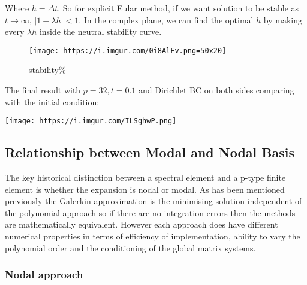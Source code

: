 \documentclass[
]{scrartcl}
\begin{document}
Where \(h=\Delta t\). So for explicit Eular method, if we want solution
to be stable as \(t\to\infty\), \(|1+\lambda h|<1\). In the complex
plane, we can find the optimal \(h\) by making every \(\lambda h\)
inside the neutral stability curve.

\begin{figure}
\centering
\texttt{[image: https://i.imgur.com/0i8AlFv.png=50x20]}
\caption{stability\%}
\end{figure}

The final result with \(p=32, t=0.1\) and Dirichlet BC on both sides
comparing with the initial condition:

\texttt{[image: https://i.imgur.com/ILSghwP.png]}

\hypertarget{relationship-between-modal-and-nodal-basis}{%
\subsection{Relationship between Modal and Nodal
Basis}\label{relationship-between-modal-and-nodal-basis}}

The key historical distinction between a spectral element and a p-type
finite element is whether the expansion is nodal or modal. As has been
mentioned previously the Galerkin approximation is the minimising
solution independent of the polynomial approach so if there are no
integration errors then the methods are mathematically equivalent.
However each approach does have different numerical properties in terms
of efficiency of implementation, ability to vary the polynomial order
and the conditioning of the global matrix systems.

\hypertarget{nodal-approach}{%
\subsubsection{Nodal approach}\label{nodal-approach}}
\end{document}
